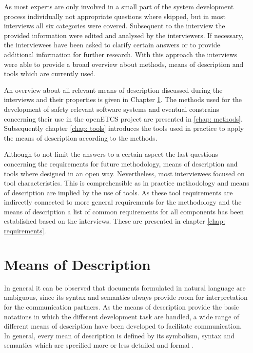 \documentclass{./template/openetcs2}
\begin{document}
As most  experts are only involved in a small part of the system development process individually not appropriate questions where skipped,  but in most interviews all six categories were covered. Subsequent to the interview the provided information were edited and analysed by the interviewers. If necessary, the interviewees have been asked to clarify certain answers or to provide additional information for further research. With this approach the interviews were able to provide a broad overview about methods, means of description and tools which are currently used.

An overview about all relevant means of description discussed during the interviews and their properties is given in Chapter \ref{chap: MoD}. The methods used for the development of safety relevant software systems and eventual constrains concerning their use in the openETCS project are presented in \ref{chap: methods}. Subsequently chapter \ref{chap: tools} introduces the tools used in practice to apply the means of description according to the methods.

Although to not limit the answers to a certain aspect the last questions concerning the requirements for future methodology, means of description and tools where designed in an open way. Nevertheless, most interviewees focused on tool characteristics. This is comprehensible as in practice  methodology and means of description are implied by the use of tools. As these tool requirements are indirectly connected to more general requirements for the methodology and the means of description a list of common requirements for all components has been established based on the interviews. These are presented in chapter \ref{chap: requirements}.

\chapter{Means of Description}

\label{chap: MoD}

In general it can be observed that documents formulated in natural language are ambiguous, since its syntax and semantics always provide room for interpretation for the communication partners. As the means of description provide the basic notations in which the different development task are handled, a wide range of different means of description have been developed to facilitate communication. In general, every mean of description is defined by its symbolism, syntax and semantics which are specified more or less detailed and formal \citep{Schnieder.2003, Schnieder.2010}.  
\end{document}
